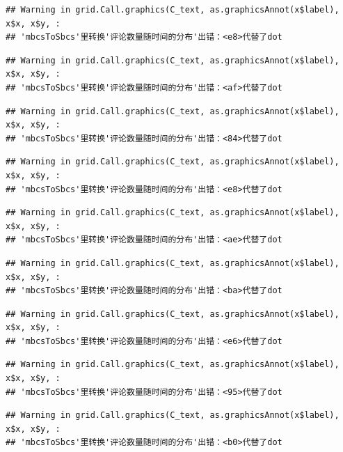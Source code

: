\documentclass[
]{article}
\begin{document}
\begin{verbatim}
## Warning in grid.Call.graphics(C_text, as.graphicsAnnot(x$label), x$x, x$y, :
## 'mbcsToSbcs'里转换'评论数量随时间的分布'出错：<e8>代替了dot
\end{verbatim}

\begin{verbatim}
## Warning in grid.Call.graphics(C_text, as.graphicsAnnot(x$label), x$x, x$y, :
## 'mbcsToSbcs'里转换'评论数量随时间的分布'出错：<af>代替了dot
\end{verbatim}

\begin{verbatim}
## Warning in grid.Call.graphics(C_text, as.graphicsAnnot(x$label), x$x, x$y, :
## 'mbcsToSbcs'里转换'评论数量随时间的分布'出错：<84>代替了dot
\end{verbatim}

\begin{verbatim}
## Warning in grid.Call.graphics(C_text, as.graphicsAnnot(x$label), x$x, x$y, :
## 'mbcsToSbcs'里转换'评论数量随时间的分布'出错：<e8>代替了dot
\end{verbatim}

\begin{verbatim}
## Warning in grid.Call.graphics(C_text, as.graphicsAnnot(x$label), x$x, x$y, :
## 'mbcsToSbcs'里转换'评论数量随时间的分布'出错：<ae>代替了dot
\end{verbatim}

\begin{verbatim}
## Warning in grid.Call.graphics(C_text, as.graphicsAnnot(x$label), x$x, x$y, :
## 'mbcsToSbcs'里转换'评论数量随时间的分布'出错：<ba>代替了dot
\end{verbatim}

\begin{verbatim}
## Warning in grid.Call.graphics(C_text, as.graphicsAnnot(x$label), x$x, x$y, :
## 'mbcsToSbcs'里转换'评论数量随时间的分布'出错：<e6>代替了dot
\end{verbatim}

\begin{verbatim}
## Warning in grid.Call.graphics(C_text, as.graphicsAnnot(x$label), x$x, x$y, :
## 'mbcsToSbcs'里转换'评论数量随时间的分布'出错：<95>代替了dot
\end{verbatim}

\begin{verbatim}
## Warning in grid.Call.graphics(C_text, as.graphicsAnnot(x$label), x$x, x$y, :
## 'mbcsToSbcs'里转换'评论数量随时间的分布'出错：<b0>代替了dot
\end{verbatim}
\end{document}
